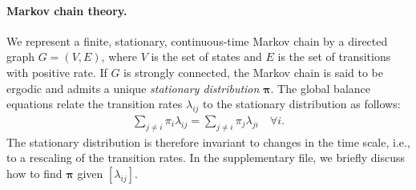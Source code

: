 \paragraph{Markov chain theory.}
We represent a finite, stationary, continuous-time Markov chain by a directed graph $G = (V, E)$, where $V$ is the set of states and $E$ is the set of transitions with positive rate.
If $G$ is strongly connected, the Markov chain is said to be ergodic and admits a unique \emph{stationary distribution} $\bm{\pi}$.
The global balance equations relate the transition rates $\lambda_{ij}$ to the stationary distribution as follows:
\begin{align}
\label{eq:balance}
\sum_{j \ne i} \pi_i \lambda_{ij} = \sum_{j \ne i} \pi_j \lambda_{ji} \quad \forall i.
\end{align}
The stationary distribution is therefore invariant to changes in the time scale, i.e., to a rescaling of the transition rates.
In the supplementary file, we briefly discuss how to find $\bm{\pi}$ given $[\lambda_{ij}]$.
